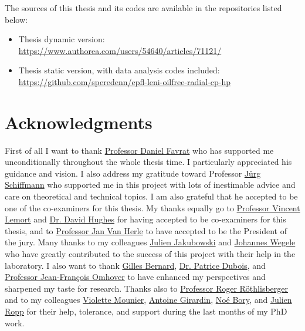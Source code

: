 The sources of this thesis and its codes are available in the
repositories listed below:

\begin{itemize}
\item Thesis dynamic version:\\
  \href{https://www.authorea.com/users/54640/articles/71121/}{https://www.authorea.com/users/54640/articles/71121/}
\item Thesis static version, with data analysis codes included:\\
  \href{https://github.com/speredenn/epfl-leni-oilfree-radial-cp-hp}{https://github.com/speredenn/epfl-leni-oilfree-radial-cp-hp}
\end{itemize}

\section*{Acknowledgments}
\label{sec:thanks}

First of all I want to thank
\href{https://ch.linkedin.com/pub/daniel-favrat/9/564/3a5}{Professor
  Daniel Favrat} who has supported me unconditionally throughout the
whole thesis time. I particularly appreciated his guidance and
vision. I also address my gratitude toward Professor
\href{http://people.epfl.ch/jurg.schiffmann}{Jürg
  Schiffmann} who supported me in this project with lots of
inestimable advice and care on theoretical and technical topics. I am
also grateful that he accepted to be one of the co-examiners for this
thesis. My thanks equally go to
\href{https://be.linkedin.com/pub/vincent-lemort/19/860/bb6}{Professor
  Vincent Lemort} and
\href{https://uk.linkedin.com/pub/david-hughes/13/658/29}{Dr. David
  Hughes} for having accepted to be co-examiners for this thesis, and
to \href{http://people.epfl.ch/jan.vanherle}{Professor Jan Van Herle} to have accepted to be the
President of the jury. Many thanks to my colleagues
\href{https://ch.linkedin.com/pub/julien-jakubowski/9/599/67a}{Julien
  Jakubowski} and
\href{https://de.linkedin.com/pub/johannes-wegele/23/27a/897/en}{Johannes
  Wegele} who have greatly contributed to the success of this project
with their help in the laboratory. I also want to thank
\href{https://fr.linkedin.com/pub/gilles-bernard/28/2a7/534/en}{Gilles
  Bernard},
\href{https://fr.linkedin.com/pub/patrice-dubois/23/2aa/922/en}{Dr. Patrice
  Dubois}, and \href{https://fr.linkedin.com/in/jfomhover}{Professor
  Jean-François Omhover} to have enhanced my perspectives and
sharpened my taste for research. Thanks also to
\href{http://www.sib.heig-vd.ch/institut/Lists/quipe/DispForm.aspx?ID=3}{Professor
  Roger Röthlisberger} and to my colleagues
\href{https://ch.linkedin.com/pub/violette-mounier/80/347/952/en}{Violette
  Mounier},
\href{https://ch.linkedin.com/pub/antoine-girardin/36/47a/5a1/en}{Antoine
  Girardin},
\href{https://ch.linkedin.com/pub/noé-bory/42/276/ba7}{Noé Bory}, and
\href{http://www.sib.heig-vd.ch/institut/Lists/quipe/DispForm.aspx?ID=1}{Julien
  Ropp} for their help, tolerance, and support during the last months
of my PhD work.

